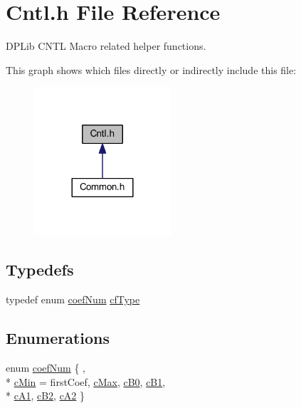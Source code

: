 \hypertarget{a00014}{\section{Cntl.\-h File Reference}
\label{a00014}
}


D\-P\-Lib C\-N\-T\-L Macro related helper functions.  


This graph shows which files directly or indirectly include this file\-:\nopagebreak
\begin{figure}[H]
\begin{center}
\leavevmode
\includegraphics[width=144pt]{a00061}
\end{center}
\end{figure}
\subsection*{Typedefs}
\begin{DoxyCompactItemize}
\item 
typedef enum \hyperlink{a00014_a4b8f446b389413b175ff4d4dbcd18da1}{coef\-Num} \hyperlink{a00014_ac340fbbc5919954c173757935549588f}{cf\-Type}
\end{DoxyCompactItemize}
\subsection*{Enumerations}
\begin{DoxyCompactItemize}
\item 
enum \hyperlink{a00014_a4b8f446b389413b175ff4d4dbcd18da1}{coef\-Num} \{ , \\*
\hyperlink{a00014_a4b8f446b389413b175ff4d4dbcd18da1ad15b967851188a21b2d4fd326304bf83}{c\-Min} = first\-Coef, 
\hyperlink{a00014_a4b8f446b389413b175ff4d4dbcd18da1a3576a9eb4b8f9d1ca3d31a0f9b889299}{c\-Max}, 
\hyperlink{a00014_a4b8f446b389413b175ff4d4dbcd18da1a3dec162fc3f68f49f43775eba612e110}{c\-B0}, 
\hyperlink{a00014_a4b8f446b389413b175ff4d4dbcd18da1a43986b141584b760c8c8c9fc29304de2}{c\-B1}, 
\\*
\hyperlink{a00014_a4b8f446b389413b175ff4d4dbcd18da1aac28a7344b33c5e968a79fc27078da99}{c\-A1}, 
\hyperlink{a00014_a4b8f446b389413b175ff4d4dbcd18da1a5229cb73bab727c5aeaae425a4fd2472}{c\-B2}, 
\hyperlink{a00014_a4b8f446b389413b175ff4d4dbcd18da1a80d8d6d72b42fa8603b71cba71e13ef2}{c\-A2}
 \}
\end{DoxyCompactItemize}
